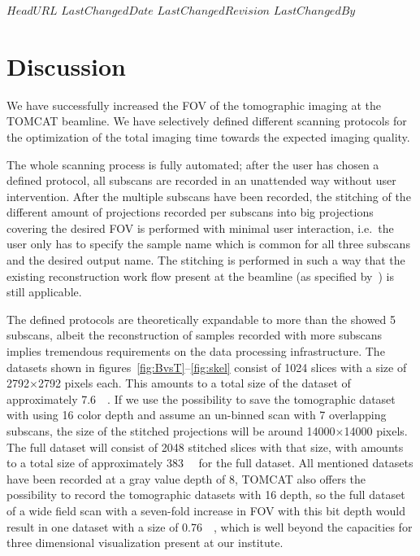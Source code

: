 \svnidlong
{$HeadURL$}
{$LastChangedDate$}
{$LastChangedRevision$}
{$LastChangedBy$}

\begin{center}
\end{center}

\section{Discussion}
We have successfully increased the FOV of the tomographic imaging at the TOMCAT beamline. We have selectively defined different scanning protocols for the optimization of the total imaging time towards the expected imaging quality.

The whole scanning process is fully automated; after the user has chosen a defined protocol, all subscans are recorded in an unattended way without user intervention. After the multiple subscans have been recorded, the stitching of the different amount of projections recorded per subscans into big projections covering the desired FOV is performed with minimal user interaction, i.e.\ the user only has to specify the sample name which is common for all three subscans and the desired output name. The stitching is performed in such a way that the existing reconstruction work flow present at the beamline (as specified by~\citet{Hintermueller2009}) is still applicable.

The defined protocols are theoretically expandable to more than the showed 5 subscans, albeit the reconstruction of samples recorded with more subscans implies tremendous requirements on the data processing infrastructure. The datasets shown in figures~\ref{fig:BvsT}--\ref{fig:skel} consist of 1024 slices with a size of 2792$\times$2792 pixels each. This amounts to a total size of the dataset of approximately \SI{7.6}{\giga\byte}. If we use the possibility to save the tomographic dataset with using \SI{16}{\bit} color depth and assume an un-binned scan with 7 overlapping subscans, the size of the stitched projections will be around 14000$\times$14000 pixels. The full dataset will consist of 2048 stitched slices with that size, with amounts to a total size of approximately \SI{383}{\giga\byte} for the full dataset. All mentioned datasets have been recorded at a gray value depth  of \SI{8}{\bit}, TOMCAT also offers the possibility to record the tomographic datasets with \SI{16}{\bit} depth, so the full dataset of a wide field scan with a seven-fold increase in FOV with this bit depth would result in one dataset with a size of \SI{0.76}{\tera\byte}, which is well beyond the capacities for three dimensional visualization present at our institute.

